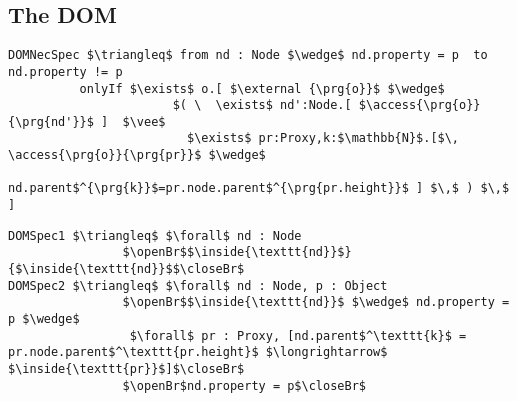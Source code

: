 \subsection{The DOM} %
\label{ss:DOM}
%
%
\begin{lstlisting}[language = Chainmail, mathescape=true,xleftmargin=2em,frame=lines,framexleftmargin=1.5em]
DOMNecSpec $\triangleq$ from nd : Node $\wedge$ nd.property = p  to nd.property != p
          onlyIf $\exists$ o.[ $\external {\prg{o}}$ $\wedge$ 
                       $( \  \exists$ nd':Node.[ $\access{\prg{o}}{\prg{nd'}}$ ]  $\vee$ 
                         $\exists$ pr:Proxy,k:$\mathbb{N}$.[$\, \access{\prg{o}}{\prg{pr}}$ $\wedge$ 
                         nd.parent$^{\prg{k}}$=pr.node.parent$^{\prg{pr.height}}$ ] $\,$ ) $\,$ ]
\end{lstlisting}
\begin{lstlisting}[language = Chainmail, mathescape=true,xleftmargin=2em,frame=lines,framexleftmargin=1.5em]
DOMSpec1 $\triangleq$ $\forall$ nd : Node
				$\openBr$$\inside{\texttt{nd}}$}{$\inside{\texttt{nd}}$$\closeBr$
DOMSpec2 $\triangleq$ $\forall$ nd : Node, p : Object
				$\openBr$$\inside{\texttt{nd}}$ $\wedge$ nd.property = p $\wedge$ 
				 $\forall$ pr : Proxy, [nd.parent$^\texttt{k}$ =  pr.node.parent$^\texttt{pr.height}$ $\longrightarrow$ $\inside{\texttt{pr}}$]$\closeBr$
				$\openBr$nd.property = p$\closeBr$
\end{lstlisting}

